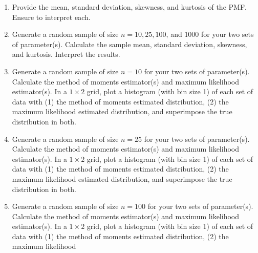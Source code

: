 \documentclass{article}\usepackage[]{graphicx}\usepackage[]{color}
\begin{document}
\begin{enumerate}
\begin{enumerate}
  \item Provide the mean, standard deviation, skewness, and kurtosis of the PMF. 
  Ensure to interpret each.
  \item Generate a random sample of size $n=10, 25, 100$, and $1000$ for your 
  two sets of parameter(s). Calculate the sample mean, standard deviation, 
  skewness, and kurtosis. Interpret the results.
  \item Generate a random sample of size $n=10$ for your two sets of parameter(s).
  Calculate the method of moments estimator(s) and maximum likelihood estimator(s).
  In a $1 \times 2$ grid, plot a histogram (with bin size 1) of each set of data 
  with (1) the method of moments estimated distribution, (2) the maximum likelihood 
  estimated distribution, and superimpose the true distribution in both.
  \item Generate a random sample of size $n=25$ for your two sets of parameter(s). 
  Calculate the method of moments estimator(s) and maximum likelihood estimator(s).
  In a $1 \times 2$ grid, plot a histogram (with bin size 1) of each set of data 
  with (1) the method of moments estimated distribution, (2) the maximum likelihood 
  estimated distribution, and superimpose the true distribution in both.
  \item Generate a random sample of size $n=100$ for your two sets of parameter(s).
  Calculate the method of moments estimator(s) and maximum likelihood estimator(s). 
  In a $1 \times 2$ grid, plot a histogram (with bin size 1) of each set of data 
  with (1) the method of moments estimated distribution, (2) the maximum likelihood

\end{enumerate}
\end{enumerate}
\end{document}
